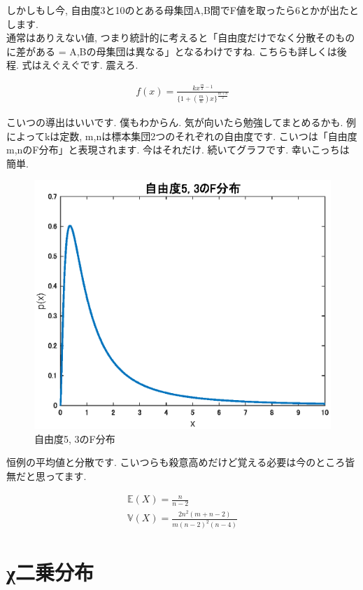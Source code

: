 \documentclass[11pt,a4paper]{ujreport} 	%
\begin{document}
しかしもし今, 自由度3と10のとある母集団A,B間でF値を取ったら6とかが出たとします. \\

通常はありえない値, つまり統計的に考えると「自由度だけでなく分散そのものに差がある = A,Bの母集団は異なる」となるわけですね. こちらも詳しくは後程. 式はえぐえぐです. 震えろ.

\begin{align}
f(x) = \frac{kx^{\frac{m}{2}-1}}{\{1 + (\frac{m}{n})x\}^{\frac{m+n}{2}}}
\end{align}

こいつの導出はいいです. 僕もわからん. 気が向いたら勉強してまとめるかも. 例によってkは定数, m,nは標本集団2つのそれぞれの自由度です. こいつは「自由度m,nのF分布」と表現されます. 今はそれだけ. 続いてグラフです. 幸いこっちは簡単.

\begin{figure}[H]
\label{im:f_dist}
  \centering
  \includegraphics[width=120mm]{../figures/f_dist.eps}
  \caption{自由度5, 3のF分布}
\end{figure}

恒例の平均値と分散です. こいつらも殺意高めだけど覚える必要は今のところ皆無だと思ってます.

\begin{align}
\mathbb{E}(X) = \frac{n}{n-2}\\
\mathbb{V}(X) = \frac{2n^2 (m+n-2)}{m(n-2)^2(n-4)}
\end{align}

\section{χ二乗分布}
\end{document}

